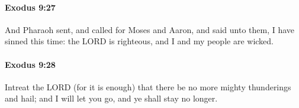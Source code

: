 		\paragraph{Exodus 9:27} %
			\label{EXODUS-9-27}

			And Pharaoh sent, and called for Moses and Aaron, and said unto them, I have sinned this time: the LORD is righteous, and I and my people are wicked.


		\paragraph{Exodus 9:28} %
			\label{EXODUS-9-28}

			Intreat the LORD (for it is enough) that there be no more mighty thunderings and hail; and I will let you go, and ye shall stay no longer.


